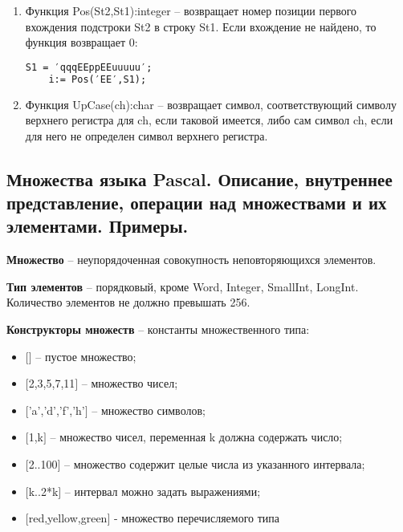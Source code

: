 \begin{enumerate}
\item Функция Pos(St2,St1):integer – возвращает номер позиции первого вхождения подстроки St2 в строку St1. Если вхождение не найдено, то функция возвращает 0:

\begin{lstlisting}[language=Pascal]
	S1 = ′qqqEEррEEuuuuu′;
 	i:= Pos(′EE′,S1);     
\end{lstlisting} 

\item Функция UpCase(ch):char – возвращает символ, соответствующий символу верхнего регистра для ch, если таковой имеется, либо сам символ ch, если для него не определен символ верхнего регистра.

\end{enumerate}





\newpage\subsection{Множества  языка  Pascal.  Описание,  внутреннее  представление,  операции  над  множествами и их элементами. Примеры. }

\begin{myquote}
            
\end{myquote}

{\bf{Множество}} – неупорядоченная совокупность неповторяющихся элементов.

{\bf{Тип элементов}} – порядковый, кроме Word, Integer, SmallInt, LongInt. Количество элементов не должно превышать 256.

{\bf{Конструкторы множеств}} – константы множественного типа:
\begin{itemize}

\item $[$$]$ – пустое множество;
\item $[$2,3,5,7,11$]$ – множество чисел;
\item $[$’a’,’d’,’f’,’h’$]$ – множество символов;
\item $[$1,k$]$ – множество чисел, переменная k должна содержать число;
\item $[$2..100$]$ – множество содержит целые числа из указанного интервала;
\item $[$k..2*k$]$ – интервал можно задать выражениями;
\item $[$red,yellow,green$]$ - множество перечисляемого типа

\end{itemize}

